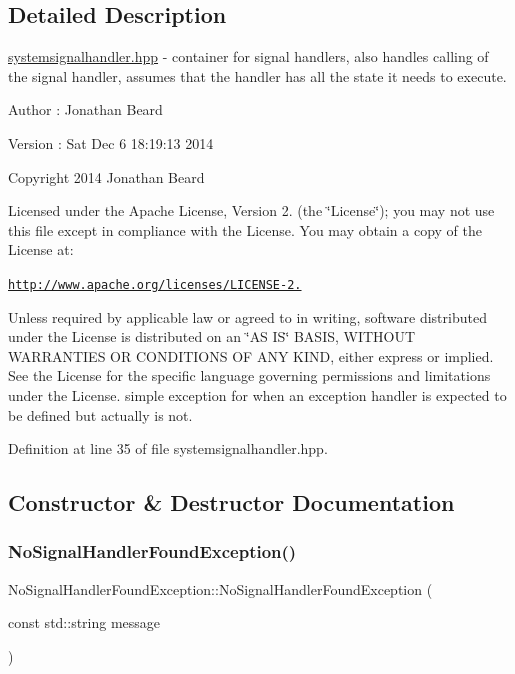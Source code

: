 \subsection{Detailed Description}
\hyperlink{systemsignalhandler_8hpp_source}{systemsignalhandler.\+hpp} -\/ container for signal handlers, also handles calling of the signal handler, assumes that the handler has all the state it needs to execute.

\begin{DoxyAuthor}{Author}
\+: Jonathan Beard 
\end{DoxyAuthor}
\begin{DoxyVersion}{Version}
\+: Sat Dec 6 18\+:19\+:13 2014
\end{DoxyVersion}
Copyright 2014 Jonathan Beard

Licensed under the Apache License, Version 2. (the \char`\"{}\+License\char`\"{}); you may not use this file except in compliance with the License. You may obtain a copy of the License at\+:

\href{http://www.apache.org/licenses/LICENSE-2.0}{\tt http\+://www.\+apache.\+org/licenses/\+L\+I\+C\+E\+N\+S\+E-\/2.}

Unless required by applicable law or agreed to in writing, software distributed under the License is distributed on an \char`\"{}\+A\+S I\+S\char`\"{} B\+A\+S\+IS, W\+I\+T\+H\+O\+UT W\+A\+R\+R\+A\+N\+T\+I\+ES OR C\+O\+N\+D\+I\+T\+I\+O\+NS OF A\+NY K\+I\+ND, either express or implied. See the License for the specific language governing permissions and limitations under the License. simple exception for when an exception handler is expected to be defined but actually is not. 

Definition at line 35 of file systemsignalhandler.\+hpp.



\subsection{Constructor \& Destructor Documentation}
\hypertarget{class_no_signal_handler_found_exception_aedbbde0eab386ffcef936bb04da96862}{}\label{class_no_signal_handler_found_exception_aedbbde0eab386ffcef936bb04da96862} 
\subsubsection{\texorpdfstring{No\+Signal\+Handler\+Found\+Exception()}{NoSignalHandlerFoundException()}}
{\footnotesize\ttfamily No\+Signal\+Handler\+Found\+Exception\+::\+No\+Signal\+Handler\+Found\+Exception (\begin{DoxyParamCaption}\item[{const std\+::string}]{message }\end{DoxyParamCaption})}

